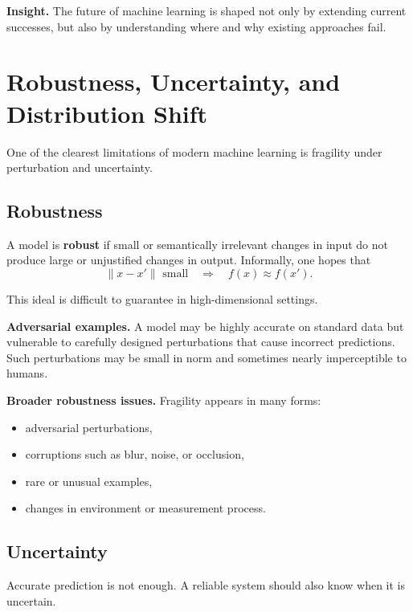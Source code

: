\medskip

\noindent
\textbf{Insight.}
The future of machine learning is shaped not only by extending current successes, but also by understanding where and why existing approaches fail.

\section{Robustness, Uncertainty, and Distribution Shift}

One of the clearest limitations of modern machine learning is fragility under perturbation and uncertainty.

\subsection{Robustness}

A model is \textbf{robust} if small or semantically irrelevant changes in input do not produce large or unjustified changes in output. Informally, one hopes that
\[
\|x-x'\| \text{ small}
\quad \Longrightarrow \quad
f(x)\approx f(x').
\]

\medskip

\noindent
This ideal is difficult to guarantee in high-dimensional settings.

\medskip

\noindent
\textbf{Adversarial examples.}
A model may be highly accurate on standard data but vulnerable to carefully designed perturbations that cause incorrect predictions. Such perturbations may be small in norm and sometimes nearly imperceptible to humans.

\medskip

\noindent
\textbf{Broader robustness issues.}
Fragility appears in many forms:
\begin{itemize}
    \item adversarial perturbations,
    \item corruptions such as blur, noise, or occlusion,
    \item rare or unusual examples,
    \item changes in environment or measurement process.
\end{itemize}

\subsection{Uncertainty}

Accurate prediction is not enough. A reliable system should also know when it is uncertain.

